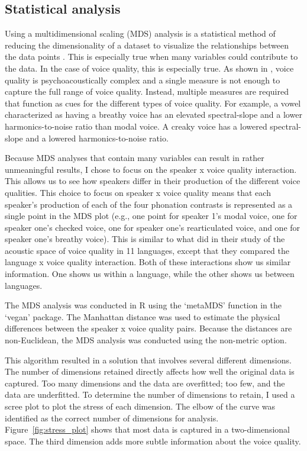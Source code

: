 \subsection{Statistical analysis} \label{sec:acousticlandscape:statistics}

Using a multidimensional scaling (MDS) analysis is a statistical method of reducing the dimensionality of a dataset to visualize the relationships between the data points \citep{b.kruskalMultidimensionalScaling1978}. This is especially true when many variables could contribute to the data. In the case of voice quality, this is especially true. As shown in \citet{kreimanUnifiedTheoryVoice2014,kreimanValidatingPsychoacousticModel2021,garellekAcousticDiscriminabilityComplex2020}, voice quality is psychoacoustically complex and a single measure is not enough to capture the full range of voice quality. Instead, multiple measures are required that function as cues for the different types of voice quality. For example, a vowel characterized as having a breathy voice has an elevated spectral-slope and a lower harmonics-to-noise ratio than modal voice. A creaky voice has a lowered spectral-slope and a lowered harmonics-to-noise ratio. 

Because MDS analyses that contain many variables can result in rather unmeaningful results, I chose to focus on the speaker x voice quality interaction. This allows us to see how speakers differ in their production of the different voice qualities. This choice to focus on speaker x voice quality means that each speaker's production of each of the four phonation contrasts is represented as a single point in the MDS plot (e.g., one point for speaker 1's modal voice, one for speaker one's checked voice, one for speaker one's rearticulated voice, and one for speaker one's breathy voice). This is similar to what \citet{keatingCrosslanguageAcousticSpace2023} did in their study of the acoustic space of voice quality in 11 languages, except that they compared the language x voice quality interaction. Both of these interactions show us similar information. One shows us within a language, while the other shows us between languages.

The MDS analysis was conducted in R using the  `metaMDS' function in the `vegan' package. The Manhattan distance was used to estimate the physical differences between the speaker x voice quality pairs. Because the distances are non-Euclidean, the MDS analysis was conducted using the non-metric option. 

This algorithm resulted in a solution that involves several different dimensions. The number of dimensions retained directly affects how well the original data is captured. Too many dimensions and the data are overfitted; too few, and the data are underfitted. To determine the number of dimensions to retain, I used a scree plot to plot the stress of each dimension. The elbow of the curve was identified as the correct number of dimensions for analysis. Figure~\ref{fig:stress_plot} shows that most data is captured in a two-dimensional space. The third dimension adds more subtle information about the voice quality.

